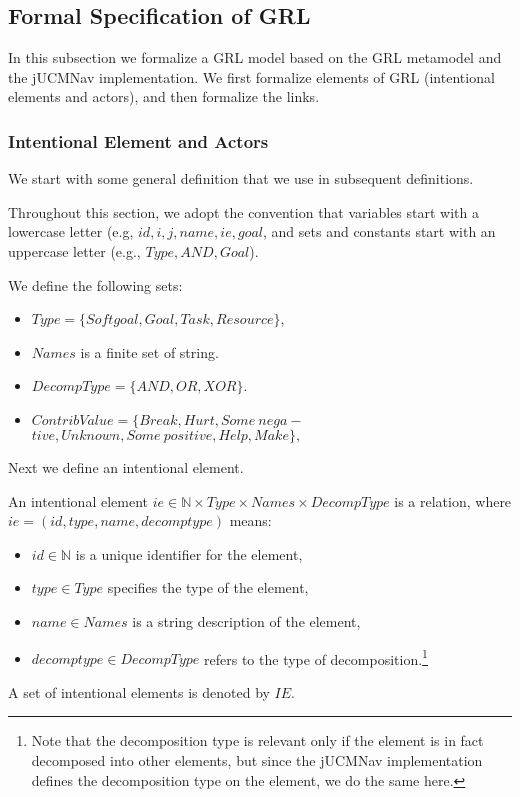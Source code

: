\subsection{Formal Specification of GRL}
\label{sect:goalmodeling:logicallanguage}

In this subsection we formalize a GRL model based on the GRL metamodel and the jUCMNav implementation. We first formalize elements of GRL (intentional elements and actors), and then formalize the links.

\subsubsection{Intentional Element and Actors}

We start with some general definition that we use in subsequent definitions.

\begin{definition}
\label{def:set-definitions}
Throughout this section, we adopt the convention that variables start with a lowercase letter (e.g, $id, i, j, name, ie, goal$, and sets and constants start with an uppercase letter (e.g., $Type, AND, Goal$).

We define the following sets:
\begin{itemize}
\item $Type = \{Softgoal, Goal, Task, Resource\}$,
\item $Names$ is a finite set of string.
\item $DecompType = \{AND,OR,XOR\}$.
\item $ContribValue = \{Break, Hurt, Some\ nega-$ $tive, Unknown, Some\  positive, Help, Make\},$
\end{itemize}
\end{definition}

Next we define an intentional element.

\begin{definition}
\label{def:ie}
An intentional element $ie\in \mathbb{N}\times Type\times Names\times DecompType$ is a relation, where $ie = (id, type, name, decomptype)$ means:
\begin{itemize}
\item $id\in \mathbb{N}$ is a unique identifier for the element,
\item $type\in Type$ specifies the type of the element,
\item $name \in Names$ is a string description of the element,
\item $decomptype\in DecompType$ refers to the type of decomposition.\footnote{Note that the decomposition type is relevant only if the element is in fact decomposed into other elements, but since the jUCMNav implementation defines the decomposition type on the element, we do the same here.}
\end{itemize}
A set of intentional elements is denoted by $IE$.
\end{definition}

